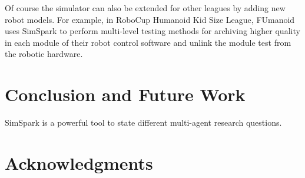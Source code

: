 \documentclass{llncs}
\begin{document}
Of course the simulator can also be extended for other leagues by adding new robot models.
For example, in RoboCup Humanoid Kid Size League, FUmanoid\cite{Donat2012} uses
SimSpark to perform multi-level testing methods for archiving higher
quality in each module of their robot control software and unlink the
module test from the robotic hardware.


\section{Conclusion and Future Work}

SimSpark is a powerful tool to state different multi-agent research questions.


\section*{Acknowledgments}



\end{document}

